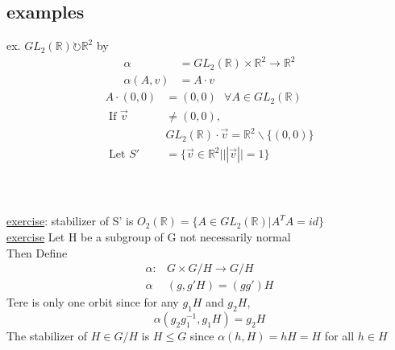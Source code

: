 \documentclass{article}
\begin{document}
\subsection{examples}
ex. $GL_2(\mathbb{R}) \circlearrowright \mathbb{R}^2$ by \begin{align*}
    \alpha &= GL_2(\mathbb{R}) \times \mathbb{R}^2 \to \mathbb{R}^2 \\ 
    \alpha(A, v) &= A \cdot v
\end{align*}
\begin{align*}
    A \cdot (0,0 ) &= (0,0) \text{ } \forall A \in GL_2(\mathbb{R}) \\
    \text{ If } \vec{v} &\not = (0,0 ), \\ 
    & GL_2(\mathbb{R} ) \cdot \vec{v} = \mathbb{R}^2 \backslash \{(0,0)\}\\ 
    \text{ Let } S' &= \{\vec{v} \in \mathbb{R}^2 | ||\vec{v}|| = 1\} \\
 \end{align*} \\ 
  \\ 
\underline{exercise}: stabilizer of S' is $O_2(\mathbb{R}) = \{A \in GL_2(\mathbb{R}) | A^T A = id\}$ \\
\underline{exercise} Let H be a subgroup of G not necessarily normal \\ 

Then Define 
\\ 
\begin{align*}
    \alpha:& G \times G / H \to G / H \\
    \alpha& (g, g'H) = (gg')H
\end{align*}
Tere is only one orbit since for any $g_1H$ and $g_2H$, $$\alpha(g_2g_{1}^{-1}, g_1H) = g_2H$$
The stabilizer of $H \in G/ H $ is $H \leq G$ since $\alpha(h,H) = hH = H$ for all $h \in H$ \\
\end{document}

